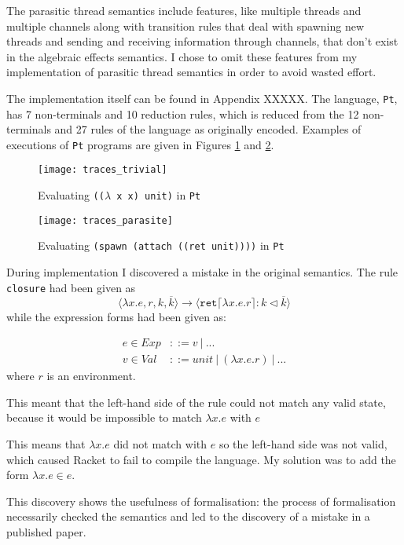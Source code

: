\documentclass[12pt,a4paper,twoside,openright]{report}
\begin{document}
The parasitic thread semantics include features, like multiple threads and multiple channels along with transition rules that deal with spawning new threads and sending and receiving information through channels, that don't exist in the algebraic effects semantics. I chose to omit these features from my implementation of parasitic thread semantics in order to avoid wasted effort.

The implementation itself can be found in Appendix XXXXX. The language, \texttt{Pt}, has 7 non-terminals and 10 reduction rules, which is reduced from the 12 non-terminals and 27 rules of the language as originally encoded. Examples of executions of \texttt{Pt} programs are given in Figures \ref{fig:traces_trivial} and \ref{fig:traces_parasite}. 

\begin{figure}
\centering
\caption{Evaluating \texttt{(($\lambda$ x x) unit)} in \texttt{Pt}}
\label{fig:traces_trivial}
\texttt{[image: traces\_trivial]}
\end{figure}

\begin{figure}
\centering
\caption{Evaluating \texttt{(spawn (attach ((ret unit))))} in \texttt{Pt}}
\label{fig:traces_parasite}
\texttt{[image: traces\_parasite]}
\end{figure}

During implementation I discovered a mistake in the original semantics. The rule \texttt{closure} had been given as
$$\langle\lambda x.e, r, k, \overline{k} \rangle \longrightarrow \langle \texttt{ret} \lceil \lambda x.e.r \rceil : k \lhd \overline{k} \rangle$$
while the expression forms had been given as:

\begin{align} 
\nonumber e \in Exp &::= v\:  |\:  ... \\
\nonumber v \in Val &::= unit\:  |\:  (\lambda x.e.r)\:  |\:  ... \end{align}
where $r$ is an environment.

This meant that the left-hand side of the rule could not match any valid state, because it would be impossible to match $\lambda x.e$ with $e$

This means that $\lambda x.e$ did not match with $e$ so the left-hand side was not valid, which caused Racket to fail to compile the language. My solution was to add the form $\lambda x.e \in e$.

This discovery shows the usefulness of formalisation: the process of formalisation necessarily checked the semantics and led to the discovery of a mistake in a published paper.
\end{document}
